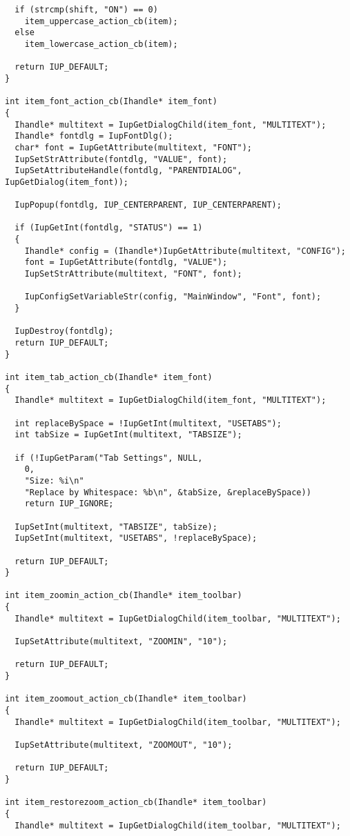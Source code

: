 \documentclass{ctexart}
\begin{document}
\begin{lstlisting}
  if (strcmp(shift, "ON") == 0)
    item_uppercase_action_cb(item);
  else
    item_lowercase_action_cb(item);

  return IUP_DEFAULT;
}

int item_font_action_cb(Ihandle* item_font)
{
  Ihandle* multitext = IupGetDialogChild(item_font, "MULTITEXT");
  Ihandle* fontdlg = IupFontDlg();
  char* font = IupGetAttribute(multitext, "FONT");
  IupSetStrAttribute(fontdlg, "VALUE", font);
  IupSetAttributeHandle(fontdlg, "PARENTDIALOG", IupGetDialog(item_font));

  IupPopup(fontdlg, IUP_CENTERPARENT, IUP_CENTERPARENT);

  if (IupGetInt(fontdlg, "STATUS") == 1)
  {
    Ihandle* config = (Ihandle*)IupGetAttribute(multitext, "CONFIG");
    font = IupGetAttribute(fontdlg, "VALUE");
    IupSetStrAttribute(multitext, "FONT", font);

    IupConfigSetVariableStr(config, "MainWindow", "Font", font);
  }

  IupDestroy(fontdlg);
  return IUP_DEFAULT;
}

int item_tab_action_cb(Ihandle* item_font)
{
  Ihandle* multitext = IupGetDialogChild(item_font, "MULTITEXT");

  int replaceBySpace = !IupGetInt(multitext, "USETABS");
  int tabSize = IupGetInt(multitext, "TABSIZE");

  if (!IupGetParam("Tab Settings", NULL,
    0,
    "Size: %i\n"
    "Replace by Whitespace: %b\n", &tabSize, &replaceBySpace))
    return IUP_IGNORE;

  IupSetInt(multitext, "TABSIZE", tabSize);
  IupSetInt(multitext, "USETABS", !replaceBySpace);

  return IUP_DEFAULT;
}

int item_zoomin_action_cb(Ihandle* item_toolbar)
{
  Ihandle* multitext = IupGetDialogChild(item_toolbar, "MULTITEXT");

  IupSetAttribute(multitext, "ZOOMIN", "10");

  return IUP_DEFAULT;
}

int item_zoomout_action_cb(Ihandle* item_toolbar)
{
  Ihandle* multitext = IupGetDialogChild(item_toolbar, "MULTITEXT");

  IupSetAttribute(multitext, "ZOOMOUT", "10");

  return IUP_DEFAULT;
}

int item_restorezoom_action_cb(Ihandle* item_toolbar)
{
  Ihandle* multitext = IupGetDialogChild(item_toolbar, "MULTITEXT");


\end{lstlisting}
\end{document}
